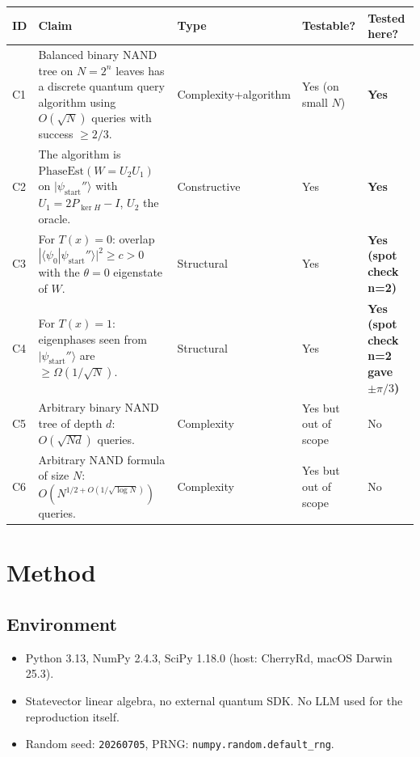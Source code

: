 \documentclass[11pt]{article}
\begin{document}
\begin{longtable}{p{} p{} p{} p{} p{}}
\toprule
ID & Claim & Type & Testable? & Tested here? \\
\midrule
C1 & Balanced binary NAND tree on $N=2^n$ leaves has a discrete quantum query algorithm using
     $O(\sqrt N)$ queries with success $\ge 2/3$. & Complexity+algorithm & Yes (on small $N$) & \textbf{Yes} \\
C2 & The algorithm is $\text{PhaseEst}(W = U_2 U_1)$ on $|\psi_{\text{start}}''\rangle$ with
     $U_1 = 2P_{\ker H}-I$, $U_2$ the oracle. & Constructive & Yes & \textbf{Yes} \\
C3 & For $T(x)=0$: overlap $|\langle \psi_0|\psi_{\text{start}}''\rangle|^2 \ge c > 0$
     with the $\theta=0$ eigenstate of $W$. & Structural & Yes & \textbf{Yes (spot check n=2)} \\
C4 & For $T(x)=1$: eigenphases seen from $|\psi_{\text{start}}''\rangle$ are $\ge \Omega(1/\sqrt N)$. & Structural & Yes & \textbf{Yes (spot check n=2 gave $\pm\pi/3$)} \\
C5 & Arbitrary binary NAND tree of depth $d$: $O(\sqrt{Nd})$ queries. & Complexity & Yes but out of scope & No \\
C6 & Arbitrary NAND formula of size $N$: $O(N^{1/2+O(1/\sqrt{\log N})})$ queries. & Complexity & Yes but out of scope & No \\
\bottomrule
\end{longtable}

\section{Method}

\subsection{Environment}
\begin{itemize}
\item Python 3.13, NumPy 2.4.3, SciPy 1.18.0 (host: CherryRd, macOS Darwin 25.3).
\item Statevector linear algebra, no external quantum SDK. No LLM used for the reproduction itself.
\item Random seed: \texttt{20260705}, PRNG: \texttt{numpy.random.default\_rng}.
\end{itemize}
\end{document}
